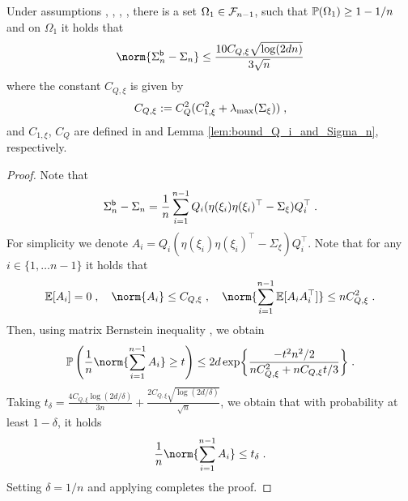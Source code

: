 \begin{lemma}
\label{lem:matrix_bernstein}
Under assumptions , , , ,  there is a set $\Omega_1 \in \mathcal{F}_{n-1}$, such that $\mathbb{P}(\Omega_1) \geq 1 - 1/n$ and on $\Omega_1$ it holds that
\begin{equation}
\norm{\Sigma_n^\boot - \Sigma_n} \leq \frac{10C_{Q,\xi}\sqrt{\log(2d n)}}{3\sqrt{n}}
\end{equation}
where the constant $C_{Q,\xi}$ is given by
\begin{equation}
\label{eq:const_C_Q_xi_def}
C_{Q,\xi} := C_{Q}^2(C_{1,\xi}^2 + \lambda_{\max}(\Sigma_{\xi}))\;,
\end{equation}
and $C_{1,\xi}$, $C_{Q}$ are defined in  and Lemma \ref{lem:bound_Q_i_and_Sigma_n}, respectively.

\end{lemma}
\begin{proof}
Note that 
\[
\Sigma_n^{\mathsf{b}} - \Sigma_n = \frac{1}{n} \sum_{i=1}^{n-1} Q_i(\eta(\xi_i)\eta(\xi_i)^\top-\Sigma_{\xi})Q_i^\top\;.
\]
For simplicity we denote $A_i = Q_i(\eta(\xi_i)\eta(\xi_i)^\top-\Sigma_{\xi})Q_i^\top$. Note that for any $i \in \{1, \ldots n-1\}$ it holds that 
\begin{equation}
\PE[A_i] = 0 \eqsp, \quad \norm{A_i} \leq C_{Q,\xi}\eqsp, \quad \norm{\sum_{i=1}^{n-1}\PE[A_iA_i^\top]}\leq nC_{Q,\xi}^2\eqsp.
\end{equation}
Then, using matrix Bernstein inequality \cite[Chapter 6]{tropp2015introduction}, we obtain 
\begin{equation}
\PP\left(\frac{1}{n}\norm{\sum_{i=1}^{n-1}A_i}\geq t\right)\leq 2d\exp\biggl\{\frac{-t^2n^2/2}{nC_{Q,\xi}^2 + nC_{Q,\xi}t/3}\biggr\} \eqsp.
    \end{equation}
    Taking $t_\delta = \frac{4C_{Q,\xi}\log(2d/\delta)}{3n} + \frac{2C_{Q,\xi}\sqrt{\log(2d/\delta)}}{\sqrt{n}}$, we obtain that with probability at least  $1-\delta$, it holds 
    \begin{equation}
    \frac{1}{n}\norm{\sum_{i=1}^{n-1}A_i}\leq t_\delta\eqsp.
    \end{equation}
Setting $\delta = 1/n$ and applying  completes the proof.
\end{proof}

